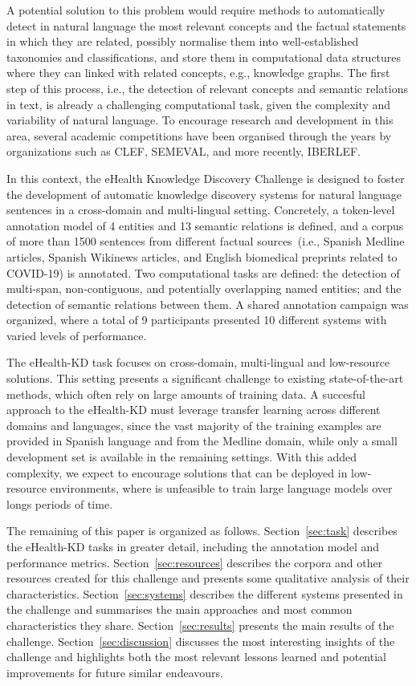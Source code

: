 \documentclass[a4paper,11pt,twocolumn,twoside]{article}
\begin{document}
A potential solution to this problem would require methods to automatically detect in natural language the most relevant concepts and the factual statements in which they are related, possibly normalise them into well-established taxonomies and classifications, and store them in computational data structures where they can linked with related concepts, e.g., knowledge graphs.
The first step of this process, i.e., the detection of relevant concepts and semantic relations in text, is already a challenging computational task, given the complexity and variability of natural language.
To encourage research and development in this area, several academic competitions have been organised through the years by organizations such as CLEF, SEMEVAL, and more recently, IBERLEF.

In this context, the eHealth Knowledge Discovery Challenge is designed to foster the development of automatic knowledge discovery systems for natural language sentences in a cross-domain and multi-lingual setting.
Concretely, a token-level annotation model of 4 entities and 13 semantic relations is defined, and a corpus of more than 1500 sentences from different factual sources~(i.e., Spanish Medline articles, Spanish Wikinews articles, and English biomedical preprints related to COVID-19) is annotated.
Two computational tasks are defined: the detection of multi-span, non-contiguous, and potentially overlapping named entities; and the detection of semantic relations between them.
A shared annotation campaign was organized, where a total of 9 participants presented 10 different systems with varied levels of performance.

The eHealth-KD task focuses on cross-domain, multi-lingual and low-resource solutions. This setting presents a significant challenge to existing state-of-the-art methods, which often rely on large amounts of training data.
A succesful approach to the eHealth-KD must leverage transfer learning across different domains and languages, since the vast majority of the training examples are provided in Spanish language and from the Medline domain, while only a small development set is available in the remaining settings.
With this added complexity, we expect to encourage solutions that can be deployed in low-resource environments, where is unfeasible to train large language models over longs periods of time.

The remaining of this paper is organized as follows.
Section~\ref{sec:task} describes the eHealth-KD tasks in greater detail, including the annotation model and performance metrics.
Section~\ref{sec:resources} describes the corpora and other resources created for this challenge and presents some qualitative analysis of their characteristics.
Section~\ref{sec:systems} describes the different systems presented in the challenge and summarises the main approaches and most common characteristics they share.
Section~\ref{sec:results} presents the main results of the challenge.
Section~\ref{sec:discussion} discusses the most interesting insights of the challenge and highlights both the most relevant lessons learned and potential improvements for future similar endeavours.
\end{document}
